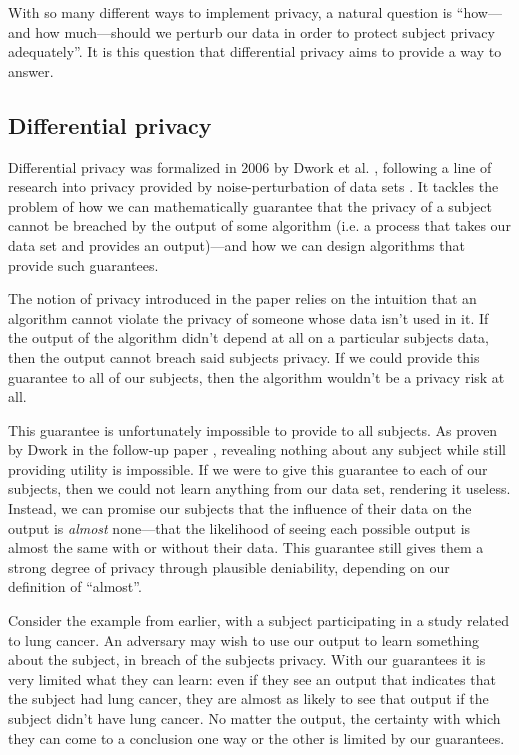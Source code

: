 \documentclass[12pt]{article}
\begin{document}
With so many different ways to implement privacy, a natural question is ``how---and how much---should we perturb our data in order to protect subject privacy adequately''. It is this question that differential privacy aims to provide a way to answer.

\subsection{Differential privacy \label{sec:promise}}

Differential privacy was formalized in 2006 by Dwork et al. \cite{dworketal2006}, following a line of research into privacy provided by noise-perturbation of data sets \cite{precursor_2003,precursor_2004,precusor_2005}. It tackles the problem of how we can mathematically guarantee that the privacy of a subject cannot be breached by the output of some algorithm (i.e. a process that takes our data set and provides an output)---and how we can design algorithms that provide such guarantees.

The notion of privacy introduced in the paper relies on the intuition that an algorithm cannot violate the privacy of someone whose data isn't used in it. If the output of the algorithm didn't depend at all on a particular subjects data, then the output cannot breach said subjects privacy. If we could provide this guarantee to all of our subjects, then the algorithm wouldn't be a privacy risk at all.

This guarantee is unfortunately impossible to provide to all subjects. As proven by Dwork in the follow-up paper \cite{dwork2006_diffpriv}, revealing nothing about any subject while still providing utility is impossible. If we were to give this guarantee to each of our subjects, then we could not learn anything from our data set, rendering it useless. Instead, we can promise our subjects that the influence of their data on the output is \emph{almost} none---that the likelihood of seeing each possible output is almost the same with or without their data. This guarantee still gives them a strong degree of privacy through plausible deniability, depending on our definition of ``almost''. \bigskip

Consider the example from earlier, with a subject participating in a study related to lung cancer. An adversary may wish to use our output to learn something about the subject, in breach of the subjects privacy. With our guarantees it is very limited what they can learn: even if they see an output that indicates that the subject had lung cancer, they are almost as likely to see that output if the subject didn't have lung cancer. No matter the output, the certainty with which they can come to a conclusion one way or the other is limited by our guarantees.
\end{document}
